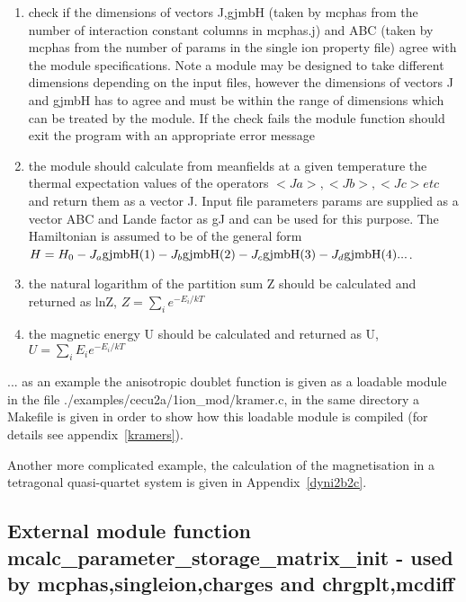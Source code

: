 \begin{enumerate}
\item check if the dimensions of vectors J,gjmbH (taken by {\prg mcphas} from the number of 
interaction constant columns in {\prg mcphas.j})
 and ABC (taken by {\prg mcphas} from the number of params in the single ion property
file) agree with the module specifications. Note a module may be designed to 
take different dimensions depending on the input files, however the dimensions
of vectors J and gjmbH has to agree and must be within the range of dimensions which
can be treated by the module. If the check fails the module function should exit the
program with an appropriate error message
\item the module should calculate from meanfields at a given temperature the 
thermal expectation values of the operators $<Ja>, <Jb>,<Jc> etc$ and return them as
a vector J. Input file parameters params are supplied as a vector ABC and
Lande factor as gJ and  can be used for this purpose. The Hamiltonian
is assumed to be of the general form $H=H_0-J_a {\rm gjmbH}(1) -J_b {\rm gjmbH}(2) -J_c {\rm gjmbH}(3) -J_d {\rm %
gjmbH}(4) ...$.
\item the natural logarithm of the partition sum Z should be calculated and returned as lnZ,
$Z=\sum_i e^{-E_i/kT}$
\item the magnetic energy U should be calculated and returned as U, $U=\sum_i E_i e^{-E_i/kT}$
\end{enumerate}

... as an example the anisotropic doublet function is given as a
loadable module in the file {\prg ./examples/cecu2a/1ion\_mod/kramer.c}, in the same
directory a Makefile is given in order to show how this loadable
module is compiled (for details see appendix~\ref{kramers}).

Another more complicated example, the calculation of the magnetisation
in a tetragonal quasi-quartet system is given in Appendix~\ref{dyni2b2c}.

\subsection{External module function {\prg mcalc\_parameter\_storage\_matrix\_init} - used by {\prg %
mcphas},{\prg singleion},{\prg charges} and {\prg %
chrgplt},{\prg mcdiff}  }


